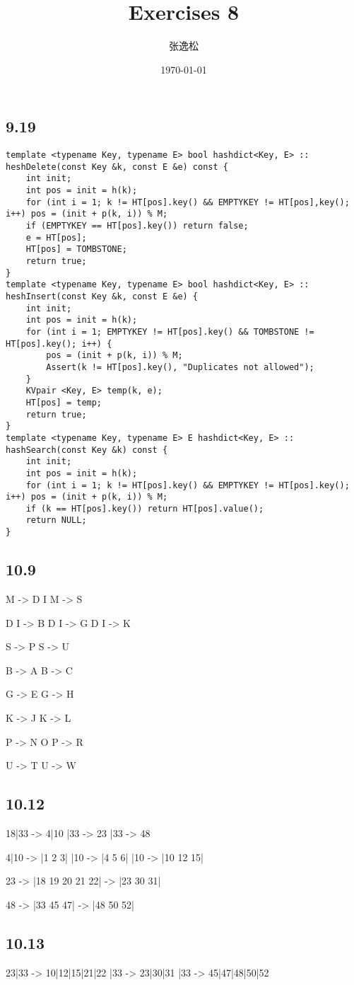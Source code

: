 \documentclass[12pt]{ctexart}
\title{Exercises 8}
\author{张逸松}
\date{\today}
\begin{document}
    \maketitle
    \subsection*{9.19}
\begin{lstlisting}
template <typename Key, typename E> bool hashdict<Key, E> :: heshDelete(const Key &k, const E &e) const {
    int init;
    int pos = init = h(k);
    for (int i = 1; k != HT[pos].key() && EMPTYKEY != HT[pos],key(); i++) pos = (init + p(k, i)) % M;
    if (EMPTYKEY == HT[pos].key()) return false;
    e = HT[pos];
    HT[pos] = TOMBSTONE;
    return true;
}
template <typename Key, typename E> bool hashdict<Key, E> :: heshInsert(const Key &k, const E &e) {
    int init;
    int pos = init = h(k);
    for (int i = 1; EMPTYKEY != HT[pos].key() && TOMBSTONE != HT[pos].key(); i++) {
        pos = (init + p(k, i)) % M;
        Assert(k != HT[pos].key(), "Duplicates not allowed");
    }
    KVpair <Key, E> temp(k, e);
    HT[pos] = temp;
    return true;
}
template <typename Key, typename E> E hashdict<Key, E> :: hashSearch(const Key &k) const {
    int init;
    int pos = init = h(k);
    for (int i = 1; k != HT[pos].key() && EMPTYKEY != HT[pos].key(); i++) pos = (init + p(k, i)) % M;
    if (k == HT[pos].key()) return HT[pos].value();
    return NULL;
}
\end{lstlisting}
    \subsection*{10.9}
    M -> D I \quad M -> S \par
    D I -> B \quad D I -> G \quad D I -> K \par
    S -> P \quad S -> U \par
    B -> A \quad B -> C \par
    G -> E \quad G -> H \par
    K -> J \quad K -> L \par
    P -> N O \quad P -> R \par
    U -> T \quad U -> W
    \subsection*{10.12}
    18|33 -> 4|10 |33 -> 23 |33 -> 48 \par
    4|10 -> |1 2 3| |10 -> |4 5 6| |10 -> |10 12 15| \par
    23 -> |18 19 20 21 22|  -> |23 30 31| \par
    48 -> |33 45 47|  -> |48 50 52|
    \subsection*{10.13}
    23|33 -> 10|12|15|21|22 |33 -> 23|30|31 |33 -> 45|47|48|50|52
\end{document}
